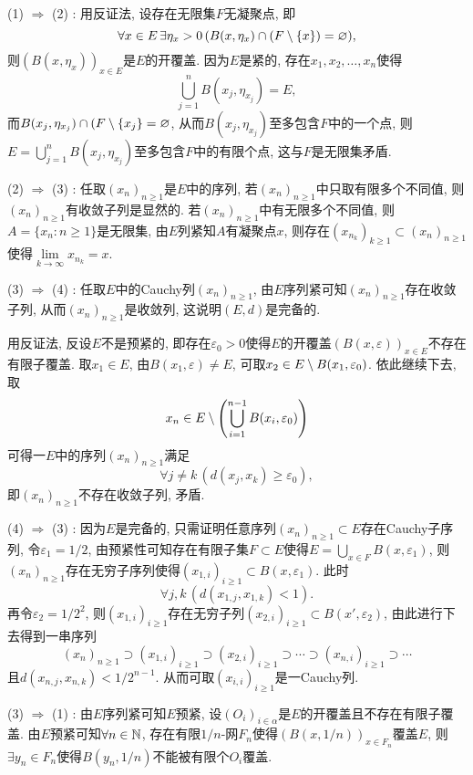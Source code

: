 	\begin{Proof}
		(1) $ \Rightarrow $ (2) : 用反证法, 设存在无限集$ F $无凝聚点, 即
		\[
		\forall x\in E\,\exists\eta_x>0\,(B(x,\eta_x)\cap(F\setminus\{x\})=\varnothing),
		\]
		则$ (B(x,\eta_x))_{x\in E} $是$ E $的开覆盖. 因为$ E $是紧的, 存在$ x_1,x_2, \dots,x_n $使得
		\[
		\bigcup_{j=1}^nB(x_j,\eta_{x_j})=E,
		\]
		而$ B(x_j,\eta_{x_j})\cap(F\setminus\{x_j\}=\varnothing $, 从而$ B(x_j,\eta_{x_j}) $至多包含$ F $中的一个点, 则$ E=\bigcup_{j=1}^nB(x_j,\eta_{x_j}) $至多包含$ F $中的有限个点, 这与$ F $是无限集矛盾.

		(2) $ \Rightarrow $ (3) : 任取$ (x_n)_{n\geqslant 1} $是$ E $中的序列, 若$ (x_n)_{n\geqslant 1} $中只取有限多个不同值, 则$ (x_n)_{n\geqslant 1} $有收敛子列是显然的. 若$ (x_n)_{n\geqslant 1} $中有无限多个不同值, 则$ A=\{ x_n : n\geqslant 1 \} $是无限集, 由$ E $列紧知$ A $有凝聚点$ x $, 则存在$ (x_{n_k})_{k\geqslant 1}\subset(x_n)_{n\geqslant 1} $使得$ \lim\limits_{k\to\infty}x_{n_{k}}=x $.

		(3) $ \Rightarrow $ (4) : 任取$ E $中的Cauchy列$ (x_n)_{n\geqslant 1} $, 由$ E $序列紧可知$ (x_n)_{n\geqslant 1} $存在收敛子列, 从而$ (x_n)_{n\geqslant 1} $是收敛列, 这说明$ (E,d) $是完备的.

		用反证法, 反设$ E $不是预紧的, 即存在$ \varepsilon_0>0 $使得$ E $的开覆盖$ (B(x,\varepsilon))_{x\in E} $不存在有限子覆盖. 取$ x_1\in E $, 由$ B(x_1,\varepsilon)\ne E $, 可取$ x_2\in E\setminus B(x_1,\varepsilon_0) $. 依此继续下去, 取
		\[
		x_n\in E\setminus\left( \bigcup_{i=1}^{n-1}B(x_i,\varepsilon_0) \right)
		\]
		可得一$ E $中的序列$ (x_n)_{n\geqslant 1} $满足
		\[
		\forall j\ne k\,(d(x_j,x_k)\geqslant\varepsilon_0),
		\]
		即$ (x_n)_{n\geqslant 1} $不存在收敛子列, 矛盾.

		(4) $ \Rightarrow $ (3) : 因为$ E $是完备的, 只需证明任意序列$ (x_n)_{n\geqslant 1}\subset E $存在Cauchy子序列, 令$ \varepsilon_1=1/2 $, 由预紧性可知存在有限子集$ F\subset E $使得$ E=\bigcup_{x\in F}B(x,\varepsilon_1) $, 则$ (x_n)_{n\geqslant 1} $存在无穷子序列使得$ (x_{1,i})_{i\geqslant 1}\subset B(x,\varepsilon_1) $. 此时
		\[
		\forall j, k\,(d(x_{1,j},x_{1,k})<1).
		\]
		再令$ \varepsilon_2=1/2^2 $, 则$ (x_{1,i})_{i\geqslant 1} $存在无穷子列$ (x_{2,i})_{i\geqslant 1}\subset B(x',\varepsilon_2) $, 由此进行下去得到一串序列
		\[
		(x_n)_{n\geqslant 1}\supset(x_{1,i})_{i\geqslant 1}\supset(x_{2,i})_{i\geqslant 1}\supset\cdots\supset(x_{n,i})_{i\geqslant 1}\supset\cdots
		\]
		且$ d(x_{n,j},x_{n,k})<1/2^{n-1} $. 从而可取$ (x_{i,i})_{i\geqslant 1} $是一Cauchy列.

		(3) $ \Rightarrow $ (1) : 由$ E $序列紧可知$ E $预紧, 设$ (O_i)_{i\in\alpha} $是$ E $的开覆盖且不存在有限子覆盖. 由$ E $预紧可知$ \forall n\in\mathbb{N} $, 存在有限$ 1/n $-网$ F_n $使得$ (B(x,1/n))_{x\in F_n} $覆盖$ E $, 则$ \exists y_n\in F_n $使得$ B(y_n,1/n) $不能被有限个$ O_i $覆盖.


\end{Proof}
